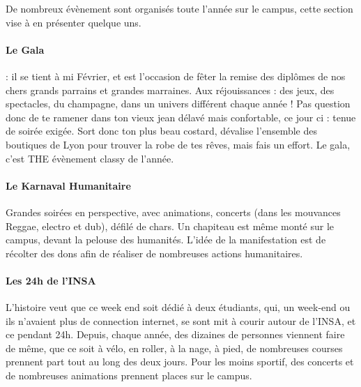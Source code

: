 De nombreux évènement sont organisés toute l'année sur le campus, cette section
vise à en présenter quelque uns.

\paragraph{Le Gala} : il se tient à mi Février, et est l'occasion de fêter la remise des
diplômes de nos chers grands parrains et grandes marraines. Aux réjouissances :
des jeux, des spectacles, du champagne, dans un univers différent chaque année !
Pas question donc de te ramener dans ton vieux jean délavé mais confortable, ce
jour ci : tenue de soirée exigée. Sort donc ton plus beau costard, dévalise
l'ensemble des boutiques de Lyon pour trouver la robe de tes rêves, mais fais un
effort. Le gala, c'est THE évènement classy de l'année.

\paragraph{Le Karnaval Humanitaire}
Grandes soirées en perspective, avec animations, concerts (dans les mouvances
	Reggae, electro et dub), défilé de chars. Un chapiteau est même monté sur le
campus, devant la pelouse des humanités. L'idée de la manifestation est de
récolter des dons afin de réaliser de nombreuses actions humanitaires.


 \paragraph{Les 24h de l'INSA}
 L'histoire veut que ce week end soit dédié à deux étudiants, qui, un
 week-end ou ils n'avaient plus de connection internet, se sont mit à courir
 autour de l'INSA, et ce pendant 24h. Depuis, chaque année, des dizaines de
 personnes viennent faire de même, que ce soit à vélo, en roller, à la nage, à
 pied, de nombreuses courses prennent part tout au long des deux jours. Pour les
 moins sportif, des concerts et de nombreuses animations prennent places sur le
 campus.

